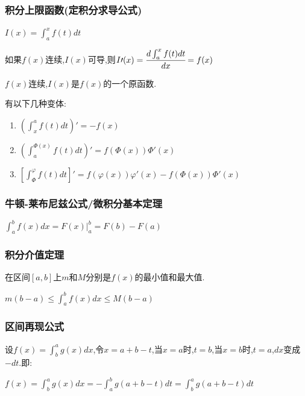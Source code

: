 \documentclass[UTF8,12pt]{ctexbook}
\newcommand{\defFunction}[1]{f(#1)}
\newcommand{\definiteIntegral}[2]{\int^{#1}_{#2}}
\begin{document}
{{{\subsubsection{积分上限函数(定积分求导公式)}{
  $I(x) = \definiteIntegral{x}{a}\defFunction{t}dt$

  如果$\defFunction{x}连续$,$I(x)$可导,则$I\prime(x) = \cfrac{d\definiteIntegral{x}{a}f(t)dt}{dx} = f(x)$

  $\defFunction{x}$连续,$I(x)$是$f(x)$的一个原函数.

  有以下几种变体:

  \begin{enumerate}
    \item $(\definiteIntegral{a}{x}\defFunction{t}dt)\prime = -\defFunction{x}$
    \item $(\definiteIntegral{\Phi(x)}{a}\defFunction{t}dt)\prime = \defFunction{\Phi(x)}\Phi\prime(x)$
    \item $[\definiteIntegral{\varphi}{\Phi}\defFunction{t}dt]\prime = \defFunction{\varphi(x)}\varphi\prime(x) - \defFunction{\Phi(x)}\Phi\prime(x)$
  \end{enumerate}

}%

\subsubsection{牛顿-莱布尼兹公式/微积分基本定理}{
  $\definiteIntegral{b}{a}\defFunction{x}dx = F(x)|^b_a = F(b) - F(a)$
}%

\subsubsection{积分介值定理}{

  在区间$[a,b]$上$m$和$M$分别是$\defFunction{x}$的最小值和最大值.

  $m(b - a) \leq \definiteIntegral{b}{a}\defFunction{x}dx \leq M(b - a)$

}%

\subsubsection{区间再现公式}{
  设$\defFunction{x} = \definiteIntegral{a}{b}g(x)dx$,令$x = a + b - t$,当$x = a$时,$t = b$,当$x = b$时,$t = a$,$dx$变成$-dt$.即:

  $\defFunction{x} = \definiteIntegral{a}{b}g(x)dx = -\definiteIntegral{b}{a}g(a+b-t)dt = \definiteIntegral{a}{b}g(a + b - t)dt$

}}}}
\end{document}
